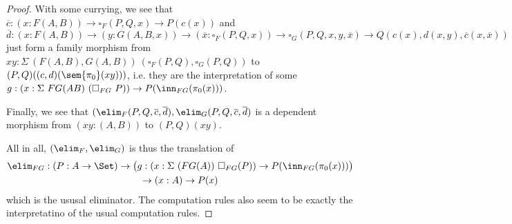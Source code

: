\documentclass{article}
\begin{document}
\begin{proof}
With some currying, we see that $\overline{c} : (x : F(A, B)) \to
\square_F(P, Q, x) \to P(c(x))$ and $\overline{d} : (x : F(A, B)) \to
(y : G(A, B, x)) \to (\overline{x} : \square_F(P, Q, x)) \to
\square_G(P, Q, x, y, \overline{x}) \to Q(c(x), d(x, y),
\overline{c}(x, \overline{x}))$ just form a family morphism from $xy :
\Sigma\ (F(A, B), G(A, B))\ (\square_F(P, Q), \square_G(P, Q))$ to
$(P, Q)((c, d)(\sem{\pi_0}(xy)))$, i.e. they are the interpretation of some $g : (x : \Sigma\ FG(AB)\ (\square_{FG}\ P)) \to P(\inn_{FG}(\pi_0(x)))$.


Finally, we see that $(\elim_F(P, Q,
\overline{c}, \overline{d}), \elim_G(P, Q, \overline{c},
\overline{d})$ is a dependent morphism from $(xy : (A, B))$ to $(P,
Q)(xy)$.

All in all, $(\elim_F, \elim_G)$ is thus the translation of 
\begin{multline*}
\elim_{FG} : (P : A \to \Set) \to \big(g : (x : \Sigma\ (FG(A))\ \square_{FG}(P)) \to P(\inn_{FG}(\pi_0(x)))\big) \\ \to (x : A) \to P(x)
\end{multline*}
which is the ususal eliminator. The computation rules also seem to be
exactly the interpretatino of the usual computation rules.
\end{proof}
\end{document}

